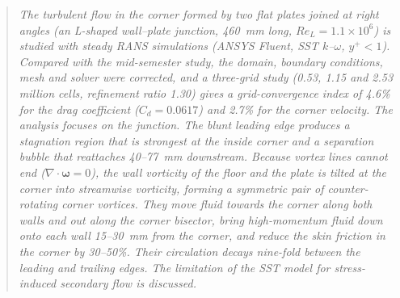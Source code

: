 \documentclass[12pt]{iitdamthes}
\begin{document}
\begin{frontmatter}
\begin{abstract}
\sl
The turbulent flow in the corner formed by two flat plates joined at right angles (an L-shaped
wall--plate junction, 460~mm long, $Re_L = 1.1\times10^6$) is studied with steady RANS simulations
(ANSYS Fluent, SST $k$--$\omega$, $y^+<1$). Compared with the mid-semester study, the domain,
boundary conditions, mesh and solver were corrected, and a three-grid study
(0.53, 1.15 and 2.53 million cells, refinement ratio 1.30) gives a grid-convergence index of
4.6\% for the drag coefficient ($C_d = 0.0617$) and 2.7\% for the corner velocity. The analysis
focuses on the junction. The blunt leading edge produces a stagnation region that is strongest at
the inside corner and a separation bubble that reattaches 40--77~mm downstream. Because vortex
lines cannot end ($\nabla\cdot\boldsymbol{\omega}=0$), the wall vorticity of the floor and the
plate is tilted at the corner into streamwise vorticity, forming a symmetric pair of
counter-rotating corner vortices. They move fluid towards the corner along both walls and out
along the corner bisector, bring high-momentum fluid down onto each wall 15--30~mm from the
corner, and reduce the skin friction in the corner by 30--50\%. Their circulation decays nine-fold
between the leading and trailing edges. The limitation of the SST model for stress-induced
secondary flow is discussed.
\end{abstract}

\makecontents


\end{frontmatter}
\end{document}
